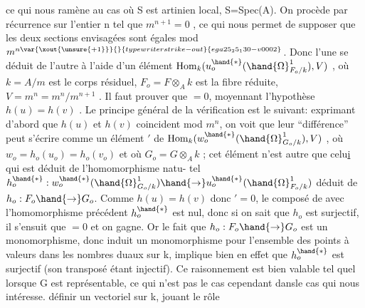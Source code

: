 
ce qui nous ramène au cas où S est artinien local, S=Spec(A). On procède
par récurrence sur l'entier n tel que $m^{n+1}=0$ , ce qui nous permet de
supposer que les deux sections envisagées  sont égales mod $m^{n\var{\xout{\unsure{+1}}}{}{typewriter strike-out}{ega25_25_130-v0002}}$. Donc
l'une se déduit de l'autre à l'aide d'un élément  
$\mathrm{Hom}_k(u_o^{\hand{*}}(\hand{\Omega}^1_{F_o/k}), V)$ , où $k=A/m$ est le corps résiduel, $F_o=F\otimes_A k$ est la
fibre réduite, $V=m^n = m^n/m^{n+1}$ . Il faut prouver que \hand{$\delta$}$= 0$, moyennant
l'hypothèse $h(u)=h(v)$ . Le principe général de la vérification est le
suivant: exprimant d'abord que $h(u)$ et $h(v)$ coincident mod $m^n$, on voit
que leur ``différence'' peut s'écrire comme un élément \hand{$\delta$}$'$ de
$\mathrm{Hom}_k(w_o^{\hand{*}}(\hand{\Omega}^1_{G_o/k}),V)$ , où $w_o = h_o(u_o)=h_o(v_o)$  et où $G_o = G\otimes_A k$ ;
cet élément n'est autre que celu\uline{i} qui est déduit de  l'homomorphisme natu-%
tel $h_o^{\hand{*}} : w_o^{\hand{*}}(\hand{\Omega}^1_{G_o/k}) \hand{\to} u_o^{\hand{*}}(\hand{\Omega}^1_{F_o/k})$ déduit de $h_o: F_o\hand{\to} G_o$. Comme
$h(u)=h(v)$ donc \hand{$\delta$}$' = 0$, le composé de \hand{$\delta$} avec l'homomorphisme précédent
$h_o^{\hand{*}}$ est nul, donc si on sait que $h_o$ est surjectif, il s'ensuit que \hand{$\delta$}$=0$
et on gagne. Or le fait que $h_o:F_o\hand{\to} G_o$ est un monomorphisme, donc induit
un monomorphisme pour l'ensemble des points à valeurs dans les nombres
duaux sur k, implique bien en effet que $h_o^{\hand{*}}$ est surjectif (son transposé
étant injectif). Ce raisonnement est bien valable tel quel lorsque G
est représentable, ce qui n'est pas le cas cependant dansle cas qui nous
intéresse.   définir un vectoriel   sur k, jouant le rôle
